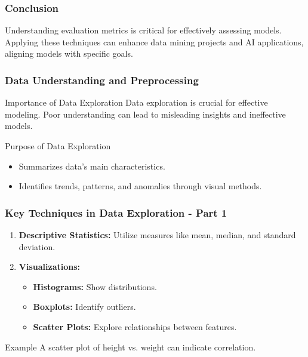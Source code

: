 \documentclass[aspectratio=169]{beamer}
\begin{document}
\begin{frame}[fragile]
    \frametitle{Conclusion}
    Understanding evaluation metrics is critical for effectively assessing models. Applying these techniques can enhance data mining projects and AI applications, aligning models with specific goals.
\end{frame}

\begin{frame}[fragile]
    \frametitle{Data Understanding and Preprocessing}
    \begin{block}{Importance of Data Exploration}
        Data exploration is crucial for effective modeling. Poor understanding can lead to misleading insights and ineffective models.
    \end{block}
    \begin{block}{Purpose of Data Exploration}
        \begin{itemize}
            \item Summarizes data's main characteristics.
            \item Identifies trends, patterns, and anomalies through visual methods.
        \end{itemize}
    \end{block}
\end{frame}

\begin{frame}[fragile]
    \frametitle{Key Techniques in Data Exploration - Part 1}
    \begin{enumerate}
        \item \textbf{Descriptive Statistics:} Utilize measures like mean, median, and standard deviation.
        \item \textbf{Visualizations:} 
        \begin{itemize}
            \item \textbf{Histograms:} Show distributions.
            \item \textbf{Boxplots:} Identify outliers.
            \item \textbf{Scatter Plots:} Explore relationships between features.
        \end{itemize}
    \end{enumerate}
    \begin{block}{Example}
        A scatter plot of height vs. weight can indicate correlation.
    \end{block}
\end{frame}
\end{document}
